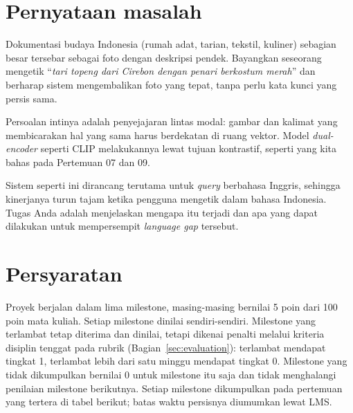 \documentclass[12pt, a4paper]{article}
\begin{document}
\section{Pernyataan masalah}\label{sec:intro}

Dokumentasi budaya Indonesia (rumah adat, tarian, tekstil, kuliner) sebagian besar tersebar sebagai foto dengan deskripsi pendek. Bayangkan seseorang mengetik ``\emph{tari topeng dari Cirebon dengan penari berkostum merah}'' dan berharap sistem mengembalikan foto yang tepat, tanpa perlu kata kunci yang persis sama.

Persoalan intinya adalah penyejajaran lintas modal: gambar dan kalimat yang membicarakan hal yang sama harus berdekatan di ruang vektor. Model \emph{dual-encoder} seperti CLIP melakukannya lewat tujuan kontrastif, seperti yang kita bahas pada Pertemuan 07 dan 09.

Sistem seperti ini dirancang terutama untuk \emph{query} berbahasa Inggris, sehingga kinerjanya turun tajam ketika pengguna mengetik dalam bahasa Indonesia. Tugas Anda adalah menjelaskan mengapa itu terjadi dan apa yang dapat dilakukan untuk mempersempit \emph{language gap} tersebut.

\section{Persyaratan}\label{sec:requirements}

Proyek berjalan dalam lima milestone, masing-masing bernilai 5 poin dari 100 poin mata kuliah. Setiap milestone dinilai sendiri-sendiri. Milestone yang terlambat tetap diterima dan dinilai, tetapi dikenai penalti melalui kriteria disiplin tenggat pada rubrik (Bagian~\ref{sec:evaluation}): terlambat mendapat tingkat 1, terlambat lebih dari satu minggu mendapat tingkat 0. Milestone yang tidak dikumpulkan bernilai 0 untuk milestone itu saja dan tidak menghalangi penilaian milestone berikutnya. Setiap milestone dikumpulkan pada pertemuan yang tertera di tabel berikut; batas waktu persisnya diumumkan lewat LMS.
\end{document}
